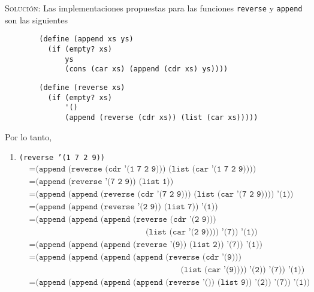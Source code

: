 \documentclass[letterpaper,11pt]{article}
\begin{document}
\begin{enumerate}
    \textsc{Solución:} Las implementaciones propuestas para las funciones 
    \texttt{reverse} y \texttt{append} son las siguientes 
    \begin{verbatim}
        (define (append xs ys)
          (if (empty? xs)
              ys
              (cons (car xs) (append (cdr xs) ys))))
    \end{verbatim}
    \begin{verbatim}
        (define (reverse xs)
          (if (empty? xs)
              '()
              (append (reverse (cdr xs)) (list (car xs)))))
    \end{verbatim}

    Por lo tanto, 
    \begin{enumerate}
        \item \texttt{(reverse '(1 7 2 9))}
        \begin{align*}
            &= \texttt{(append (reverse (cdr '(1 7 2 9))) 
                               (list (car '(1 7 2 9))))} \\
            &= \texttt{(append (reverse '(7 2 9)) (list 1))} \\
            &= \texttt{(append (append (reverse (cdr '(7 2 9))) 
                                       (list (car '(7 2 9)))) '(1))} \\
            &= \texttt{(append (append (reverse '(2 9)) (list 7)) '(1))} \\
            &= \texttt{(append (append (append (reverse (cdr '(2 9)))} \\
            & \; \; \; \; \; \; \; \; \; \; \; \; \; \; \; \; \; \; \; \; \; \;  
              \; \; \; \; \; \; \; \; \; \; \; \; \; \; \; \; \; \; \; \; \; \;
              \; \; \; \; \; \;                
                                               \texttt{(list (car '(2 9)))) '(7)) '(1))} \\
            &= \texttt{(append (append (append (reverse '(9)) (list 2)) '(7)) '(1))} \\ 
            &= \texttt{(append (append (append (append (reverse (cdr '(9)))} \\ 
            & \; \; \; \; \; \; \; \; \; \; \; \; \; \; \; \; \; \; \; \; \; \;
              \; \; \; \; \; \; \; \; \; \; \; \; \; \; \; \; \; \; \; \; \; \;
              \; \; \; \; \; \; \; \; \; \; \; \; \; \; \; \; \; \; \; \; \;
                                                       \texttt{(list (car '(9)))) '(2)) '(7)) '(1))} \\
            &= \texttt{(append (append (append (append (reverse '()) (list 9)) '(2)) '(7)) '(1))} \\

\end{align*}
\end{enumerate}
\end{enumerate}
\end{document}

